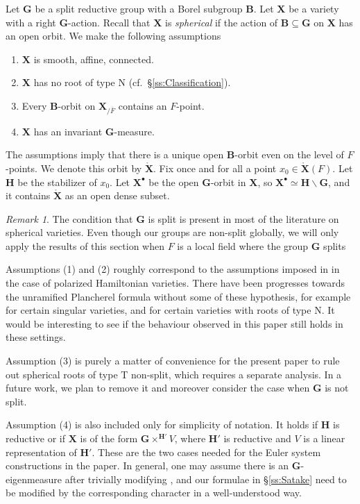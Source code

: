\documentclass{amsart}
\theoremstyle{definition}
\theoremstyle{remark}
\newtheorem{remark}[theorem]{Remark}
\newcommand{\1}{\mathbf{1}}
\newcommand{\mb}[1]{\mathbf{#1}}
\theoremstyle{definition}
\newcommand{\bH}{\mathbf{H}}
\newcommand{\bG}{\mathbf{G}}
\newcommand{\open}[1]{\mathring{#1}}
\begin{document}
Let $\bG$ be a split reductive group with a Borel subgroup $\mb{B}$. Let $\mb{X}$ be a variety with a right $\bG$-action. Recall that $\mb{X}$ is \emph{spherical} if the action of $\mb{B}\subseteq\bG$ on $\mb{X}$ has an open orbit. We make the following assumptions
\begin{enumerate}
  \item $\mb{X}$ is smooth, affine, connected.
  \item $\mb{X}$ has no root of type N (cf.\ \S\ref{ss:Classification}).
  \item Every $\mb{B}$-orbit on $\mb{X}_{/\overline{F}}$ contains an $F$-point.
  \item $\mb{X}$ has an invariant $\mb{G}$-measure.
\end{enumerate}
The assumptions imply that there is a unique open $\mb{B}$-orbit even on the level of $F$-points. We denote this orbit by $\mathring{\mb{X}}$. Fix once and for all a point $x_0\in\open{\mb{X}}(F)$. Let $\bH$ be the stabilizer of $x_0$. Let $\mb{X}^\bullet$ be the open $\mb{G}$-orbit in $\mb{X}$, so $\mb{X}^\bullet\simeq\mb{H}\backslash\bG$, and it contains $\mathring{\mb{X}}$ as an open dense subset.

\begin{remark}
  The condition that $\bG$ is split is present in most of the literature on spherical varieties. Even though our groups are non-split globally, we will only apply the results of this section when $F$ is a local field where the group $\bG$ splits

  Assumptions (1) and (2) roughly correspond to the assumptions imposed in \cite{BZSV} in the case of polarized Hamiltonian varieties. There have been progresses towards the unramified Plancherel formula without some of these hypothesis, for example \cite{SakWang} for certain singular varieties, and \cite{MurilloII} for certain varieties with roots of type N. It would be interesting to see if the behaviour observed in this paper still holds in these settings.
  
  Assumption (3) is purely a matter of convenience for the present paper to rule out spherical roots of type T non-split, which requires a separate analysis. In a future work, we plan to remove it and moreover consider the case when $\bG$ is not split.

  Assumption (4) is also included only for simplicity of notation. It holds if $\mb{H}$ is reductive or if $\mb{X}$ is of the form $\mb{G}\times^{\mb{H}'}V$, where $\mb{H}'$ is reductive and $V$ is a linear representation of $\mb{H}'$. These are the two cases needed for the Euler system constructions in the paper. In general, one may assume there is an $\mb{G}$-eigenmeasure after trivially modifying \cite[\S 3.8]{SakComp}, and our formulae in \S\ref{ss:Satake} need to be modified by the corresponding character in a well-understood way.
\end{remark}
\end{document}
